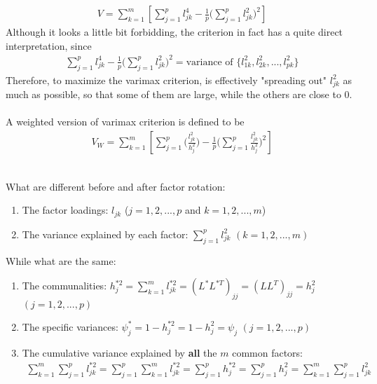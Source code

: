 \documentclass[12pt]{extarticle}
\newcommand{\<}{\langle}
\renewcommand{\>}{\rangle}
\theoremstyle{definition}
\begin{document}
\begin{tcolorbox}[enhanced, drop fuzzy shadow, title=Varimax Criterion (No need to memorize)]
\begin{align*}
    V=\sum^m_{k=1}\left[\sum^p_{j=1}l^4_{jk} -\frac{1}{p}\Bigg(\sum^p_{j=1}l^2_{jk}\Bigg)^2 \right]
\end{align*}
Although it looks a little bit forbidding, the criterion in fact has a quite direct interpretation, since
\begin{align*}
    \sum^p_{j=1}l^4_{jk} -\frac{1}{p}\Bigg(\sum^p_{j=1}l^2_{jk}\Bigg)^2 = \text{variance of } \{l^2_{1k},l^2_{2k},...,l^2_{pk}\}
\end{align*}
Therefore, to maximize the varimax criterion, is effectively "spreading out" $l^2_{jk}$ as much as possible, so that some of them are large, while the others are close to 0.\\
\ \\
A weighted version of varimax criterion is defined to be
\begin{align*}
    V_W=\sum^m_{k=1}\left[\sum^p_{j=1}\Bigg(\frac{l^2_{jk}}{h^2_j}\Bigg) -\frac{1}{p}\Bigg(\sum^p_{j=1}\frac{l^2_{jk}}{h^2_j}\Bigg)^2 \right]
\end{align*}
\end{tcolorbox}
\newpage
\ \\
What are different before and after factor rotation:
\begin{enumerate}
    \item The factor loadings: $l_{jk}$ ($j=1,2,...,p$ and $k=1,2,...,m$)
    \item The variance explained by each factor: $\sum^p_{j=1} l^2_{jk}$ $(k=1,2,...,m)$
\end{enumerate}
While what are the same:
\begin{enumerate}
    \item The communalities: $h^{*2}_j =\sum^m_{k=1}l^{*2}_{jk}=(L^*L^{*T})_{jj}=(LL^T)_{jj}=h^2_j$ $(j=1,2,...,p)$
    \item The specific variances: $\psi^*_j =1-h^{*2}_j =1-h^2_j =\psi_j$ $(j=1,2,...,p)$
    \item The cumulative variance explained by \textbf{all} the $m$ common factors:
    \begin{align*}
        \sum^m_{k=1}\sum^p_{j=1}l^{*2}_{jk}
        =\sum^p_{j=1}\sum^m_{k=1}l^{*2}_{jk}
        =\sum^p_{j=1}h^{*2}_j
        =\sum^p_{j=1}h^2_j
        =\sum^m_{k=1}\sum^p_{j=1}l^{2}_{jk}
    \end{align*}
\end{enumerate}
\end{document}
